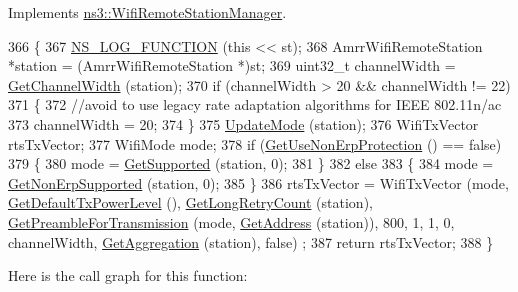 Implements \hyperlink{classns3_1_1WifiRemoteStationManager_abf44eccb31d4b1b58644fd6721d132c9}{ns3\+::\+Wifi\+Remote\+Station\+Manager}.


\begin{DoxyCode}
366 \{
367   \hyperlink{log-macros-disabled_8h_a90b90d5bad1f39cb1b64923ea94c0761}{NS\_LOG\_FUNCTION} (\textcolor{keyword}{this} << st);
368   AmrrWifiRemoteStation *station = (AmrrWifiRemoteStation *)st;
369   uint32\_t channelWidth = \hyperlink{classns3_1_1WifiRemoteStationManager_a918213c5b9fa629c4986f6d90521bbd4}{GetChannelWidth} (station);
370   \textcolor{keywordflow}{if} (channelWidth > 20 && channelWidth != 22)
371     \{
372       \textcolor{comment}{//avoid to use legacy rate adaptation algorithms for IEEE 802.11n/ac}
373       channelWidth = 20;
374     \}
375   \hyperlink{classns3_1_1AmrrWifiManager_a2bdf0c3696234b2d530d3becd174afdd}{UpdateMode} (station);
376   WifiTxVector rtsTxVector;
377   WifiMode mode;
378   \textcolor{keywordflow}{if} (\hyperlink{classns3_1_1WifiRemoteStationManager_a2d3d93f08995e554960a177a52f90f2f}{GetUseNonErpProtection} () == \textcolor{keyword}{false})
379     \{
380       mode = \hyperlink{classns3_1_1WifiRemoteStationManager_a995c8bae0d84b168fd3e8bc9ecaacdd4}{GetSupported} (station, 0);
381     \}
382   \textcolor{keywordflow}{else}
383     \{
384       mode = \hyperlink{classns3_1_1WifiRemoteStationManager_a3df8f1931f1fce653e5990a2821b44c6}{GetNonErpSupported} (station, 0);
385     \}
386   rtsTxVector = WifiTxVector (mode, \hyperlink{classns3_1_1WifiRemoteStationManager_acff2fc859ee6b4c66ea7a83dd075b5d6}{GetDefaultTxPowerLevel} (), 
      \hyperlink{classns3_1_1WifiRemoteStationManager_aac10b1403fb0bd670f8a8bd6d7e48304}{GetLongRetryCount} (station), \hyperlink{classns3_1_1WifiRemoteStationManager_a0f44967cbd7488baada4802ebc642110}{GetPreambleForTransmission} (mode, 
      \hyperlink{classns3_1_1WifiRemoteStationManager_ac9ccc8c514bd8d2af05c290e63461a2a}{GetAddress} (station)), 800, 1, 1, 0, channelWidth, \hyperlink{classns3_1_1WifiRemoteStationManager_a5421c8d510cb16eebeac9f2ea9dd73c3}{GetAggregation} (station), \textcolor{keyword}{false})
      ;
387   \textcolor{keywordflow}{return} rtsTxVector;
388 \}
\end{DoxyCode}


Here is the call graph for this function\+:


